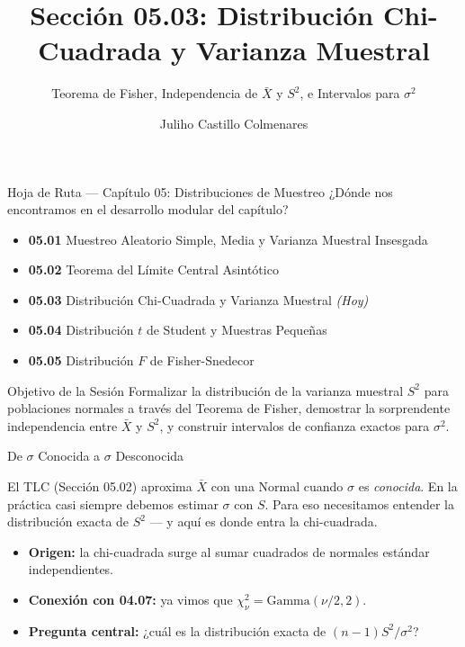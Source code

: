 \documentclass[10pt, aspectratio=169]{beamer}
\title[Chi-Cuadrada y Varianza Muestral]{Sección 05.03: Distribución Chi-Cuadrada y Varianza Muestral}
\subtitle{Teorema de Fisher, Independencia de $\bar{X}$ y $S^2$, e Intervalos para $\sigma^2$}
\author[J. Castillo Colmenares]{Juliho Castillo Colmenares}
\institute{Tecnológico de Monterrey}
\date{\vspace{-1.2cm}}
\begin{document}
\begin{frame}[plain]
  \vspace{-0.8cm}
  \titlepage
\end{frame}

\begin{frame}{Hoja de Ruta --- Capítulo 05: Distribuciones de Muestreo}
  \footnotesize
  ¿Dónde nos encontramos en el desarrollo modular del capítulo? \pause
  \begin{itemize}\itemsep=0.08em
    \item \textbf{05.01} Muestreo Aleatorio Simple, Media y Varianza Muestral Insesgada \pause
    \item \textbf{05.02} Teorema del Límite Central Asintótico \pause
    \item \textbf{05.03} Distribución Chi-Cuadrada y Varianza Muestral \emph{(Hoy)} \pause
    \item \textbf{05.04} Distribución $t$ de Student y Muestras Pequeñas \pause
    \item \textbf{05.05} Distribución $F$ de Fisher-Snedecor
  \end{itemize}
  \vspace{-0.05cm}
  \begin{block}{Objetivo de la Sesión}
    Formalizar la distribución de la varianza muestral $S^2$ para poblaciones normales a través del Teorema de Fisher, demostrar la sorprendente independencia entre $\bar{X}$ y $S^2$, y construir intervalos de confianza exactos para $\sigma^2$.
  \end{block}
\end{frame}

\begin{frame}{De $\sigma$ Conocida a $\sigma$ Desconocida}
  \footnotesize
  \begin{motivacion}
    El TLC (Sección 05.02) aproxima $\bar{X}$ con una Normal cuando $\sigma$ es \emph{conocida}. En la práctica casi siempre debemos estimar $\sigma$ con $S$. Para eso necesitamos entender la distribución exacta de $S^2$ --- y aquí es donde entra la chi-cuadrada.
  \end{motivacion}

  \vspace{0.15cm}
  \pause
  \begin{itemize}\itemsep=0.1cm
    \item \textbf{Origen:} la chi-cuadrada surge al sumar cuadrados de normales estándar independientes. \pause
    \item \textbf{Conexión con 04.07:} ya vimos que $\chi^2_\nu = \text{Gamma}(\nu/2, 2)$. \pause
    \item \textbf{Pregunta central:} ¿cuál es la distribución exacta de $(n-1)S^2/\sigma^2$?
  \end{itemize}
\end{frame}
\end{document}
